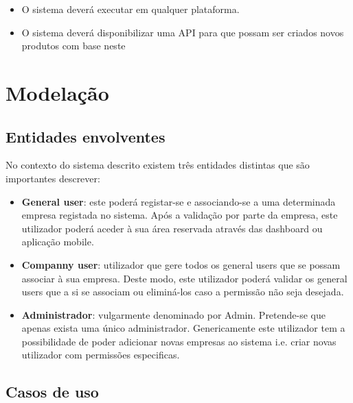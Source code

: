 \begin{itemize}
	\item O sistema deverá executar em qualquer plataforma.
	
	\item O sistema deverá disponibilizar uma API para que possam ser criados novos produtos com base neste 
	
	
\end{itemize}



\newpage
\section{Modelação}
\subsection{Entidades envolventes}




No contexto do sistema descrito existem três entidades distintas que são importantes descrever: 

\begin{itemize}
	
	\item \textbf{General user}: este poderá registar-se e associando-se a uma determinada empresa registada no sistema. Após a validação por parte da empresa, este utilizador poderá aceder à sua área reservada através das dashboard ou aplicação mobile. 
	
	\item \textbf{Companny user}: utilizador que gere todos os general users que se possam associar à sua empresa. Deste modo, este utilizador poderá validar os general users que a si se associam ou eliminá-los caso a permissão não seja desejada.  
	
	\item \textbf{Administrador}: vulgarmente denominado por Admin. Pretende-se que apenas exista uma único administrador. Genericamente este utilizador tem a possibilidade de poder adicionar novas empresas ao sistema i.e. criar novas utilizador com permissões especificas. 
	
\end{itemize}



\newpage

\subsection{Casos de uso}


